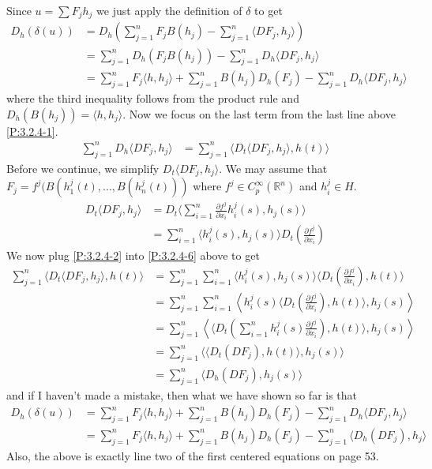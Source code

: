 \documentclass[a4paper,11pt]{article}
\numberwithin{equation}{section}
\theoremstyle{plain}
\theoremstyle{definition}
\newcommand{\R}{\mathbb{R}}
\numberwithin{NQ}{section}
\numberwithin{LQ}{section}
\numberwithin{ZQ}{section}
\begin{document}
Since $u=\sum F_jh_j$ we just apply the definition of $\delta$ to get
\begin{align}
D_h(\delta(u)) &= D_h\left(  \sum_{j=1}^n F_j B(h_j) - \sum_{j=1}^n\langle DF_j, h_j \rangle \right) \nonumber
\\&=   \sum_{j=1}^n D_h(F_j B(h_j)) - \sum_{j=1}^nD_h\langle DF_j, h_j \rangle \nonumber
\\&= \sum_{j=1}^n F_j \langle h, h_j \rangle +\sum_{j=1}^n B(h_j)D_h(F_j) - \sum_{j=1}^nD_h\langle DF_j, h_j \rangle  \label{P:3.2.4-1}
\end{align}
where the third inequality follows from the product rule and $D_h(B(h_j)) =  \langle h, h_j \rangle$.
Now we focus on the last term from the last line above \eqref{P:3.2.4-1}.
\begin{align}
\sum_{j=1}^nD_h\langle DF_j, h_j \rangle & = \sum_{j=1}^n\langle D_t \langle DF_j, h_j \rangle, h(t) \rangle \label{P:3.2.4-6}
\end{align}
Before we continue, we simplify $D_t \langle DF_j, h_j \rangle$. We may assume that $F_j=f^j(B(h_1^j(t),...,B(h_n^j(t)))$ where $f^j \in C_p^\infty(\R^n)$ and $h_i^j \in H$.
\begin{align}
D_t \langle DF_j, h_j \rangle &= D_t \langle\sum_{i=1}^n \frac{\partial f^j}{\partial x_i}h_i^j(s), h_j(s) \rangle \nonumber
\\ &= \sum_{i=1}^n\langle h_i^j(s), h_j(s) \rangle D_t\left( \frac{\partial f^j}{\partial x_i}\right) \label{P:3.2.4-2}
\end{align}
We now plug \eqref{P:3.2.4-2} into \eqref{P:3.2.4-6} above to get
\begin{align*}
\sum_{j=1}^n\langle D_t \langle DF_j, h_j \rangle, h(t) \rangle &= \sum_{j=1}^n \sum_{i=1}^n\langle h_i^j(s), h_j(s) \rangle \langle D_t\left( \frac{\partial f^j}{\partial x_i}\right), h(t)\rangle
\\&= \sum_{j=1}^n \sum_{i=1}^n\left\langle h_i^j(s)\langle D_t\left( \frac{\partial f^j}{\partial x_i}\right), h(t)\rangle, h_j(s) \right\rangle
\\&= \sum_{j=1}^n \left\langle \langle D_t\left(\sum_{i=1}^nh_i^j(s) \frac{\partial f^j}{\partial x_i}\right), h(t)\rangle, h_j(s) \right\rangle
\\& = \sum_{j=1}^n \bigg\langle \langle D_t\left(DF_j\right), h(t)\rangle, h_j(s) \bigg\rangle
\\& = \sum_{j=1}^n \bigg\langle D_h\left(DF_j\right), h_j(s) \bigg\rangle
\end{align*}
and if I haven't made a mistake, then what we have shown so far is that
\begin{align}
D_h(\delta(u))  & = \sum_{j=1}^n F_j \langle h, h_j \rangle +\sum_{j=1}^n B(h_j)D_h(F_j) - \sum_{j=1}^nD_h\langle DF_j, h_j \rangle \nonumber
\\&= \sum_{j=1}^n F_j \langle h, h_j \rangle + \sum_{j=1}^n B(h_j)D_h(F_j)- \sum_{j=1}^n \bigg\langle D_h\left(DF_j\right), h_j \bigg\rangle \label{P:3.2.4-3}
\end{align}
Also, the above is exactly line two of the first centered equations on page 53.
\end{document}
